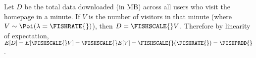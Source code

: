 Let $D$ be the total data downloaded (in MB) across all users who visit the homepage in a minute. If $V$ is the number of visitors in that minute (where $V\sim\Poi(\lambda = \FISHRATE{})$), then $D = \FISHSCALE{}V$. Therefore by linearity of expectation, $E[D] = E[\FISHSCALE{}V] = \FISHSCALE{}E[V] = \FISHSCALE{}(\FISHRATE{}) = \FISHPROD{}$.